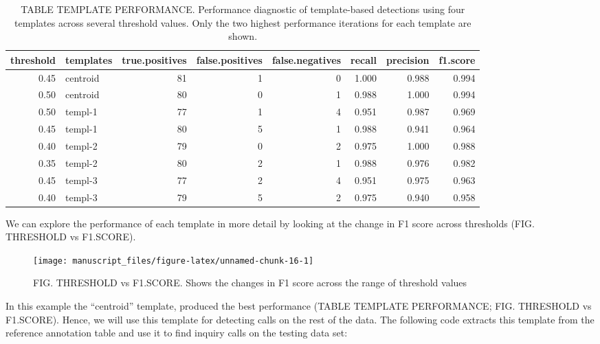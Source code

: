 \documentclass[
]{article}
\begin{document}
\begin{table}

\caption{\label{tab:unnamed-chunk-15}TABLE TEMPLATE PERFORMANCE. Performance diagnostic of template-based detections using four templates across several threshold values. Only the two highest performance iterations for each template are shown.}
\centering
\begin{tabular}[t]{r|l|r|r|r|r|r|r}
\hline
threshold & templates & true.positives & false.positives & false.negatives & recall & precision & f1.score\\
\hline
0.45 & centroid & 81 & 1 & 0 & 1.000 & 0.988 & 0.994\\
\hline
0.50 & centroid & 80 & 0 & 1 & 0.988 & 1.000 & 0.994\\
\hline
0.50 & templ-1 & 77 & 1 & 4 & 0.951 & 0.987 & 0.969\\
\hline
0.45 & templ-1 & 80 & 5 & 1 & 0.988 & 0.941 & 0.964\\
\hline
0.40 & templ-2 & 79 & 0 & 2 & 0.975 & 1.000 & 0.988\\
\hline
0.35 & templ-2 & 80 & 2 & 1 & 0.988 & 0.976 & 0.982\\
\hline
0.45 & templ-3 & 77 & 2 & 4 & 0.951 & 0.975 & 0.963\\
\hline
0.40 & templ-3 & 79 & 5 & 2 & 0.975 & 0.940 & 0.958\\
\hline
\end{tabular}
\end{table}

We can explore the performance of each template in more detail by
looking at the change in F1 score across thresholds (FIG. THRESHOLD vs
F1.SCORE).

\begin{figure}

{\centering \texttt{[image: manuscript\_files/figure-latex/unnamed-chunk-16-1]} 

}

\caption{FIG. THRESHOLD vs F1.SCORE. Shows the changes in F1 score across the range of threshold values}\label{fig:unnamed-chunk-16}
\end{figure}

In this example the ``centroid'' template, produced the best performance
(TABLE TEMPLATE PERFORMANCE; FIG. THRESHOLD vs F1.SCORE). Hence, we will
use this template for detecting calls on the rest of the data. The
following code extracts this template from the reference annotation
table and use it to find inquiry calls on the testing data set:
\end{document}
